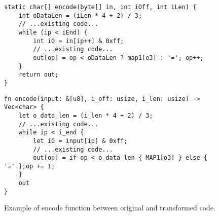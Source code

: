 \begin{figure}[htb]
\centering
\begin{minipage}{.95\linewidth}
\begin{tcolorbox}[colback=gray!5!white, colframe=cyan!40!black, boxsep=2pt, top=1mm, bottom=1mm, left=0pt, right=0pt, title=\centering{Original code}]
\begin{verbatim}
static char[] encode(byte[] in, int iOff, int iLen) {
    int oDataLen = (iLen * 4 + 2) / 3;       
    // ...existing code...
    while (ip < iEnd) {
        int i0 = in[ip++] & 0xff;
        // ...existing code...
        out[op] = op < oDataLen ? map1[o3] : '='; op++;
    }
    return out;
}
\end{verbatim}
\end{tcolorbox}
\end{minipage}

\vspace{1em} %

\begin{minipage}{.95\linewidth}
\centering
\begin{tcolorbox}[colback=gray!5!white, colframe=cyan!40!black, boxsep=2pt, top=1mm, bottom=1mm, left=0pt, right=0pt, title=\centering{Transformed code}]
\begin{verbatim}
fn encode(input: &[u8], i_off: usize, i_len: usize) -> Vec<char> {
    let o_data_len = (i_len * 4 + 2) / 3;
    // ...existing code...
    while ip < i_end {
        let i0 = input[ip] & 0xff;
        // ...existing code...
        out[op] = if op < o_data_len { MAP1[o3] } else { '=' };op += 1;
    }
    out
}
\end{verbatim}
\end{tcolorbox}
\end{minipage}
\caption{Example of encode function between original and transformed code.}
    \label{code:eva:encode_case}
\end{figure}
